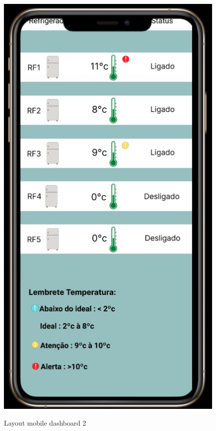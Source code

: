     \begin{figure}[ht]
        \caption{Layout mobile dashboard 2}
        \centering
        \includegraphics[scale=0.5]{img/mobile/dashboard_2.jpeg}
        \label{fig:mobileDashboard2}
    \end{figure}

